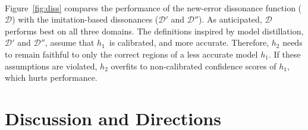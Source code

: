 \documentclass[letterpaper]{article} %
\newcommand{\bug}
    {\mbox{\rule{2mm}{2mm}}}
\newcommand{\Bug}[1]
    {\bug \footnote{BUG: {#1}}}
\newcommand{\?}{\mbox{?}}
\newcommand{\hone}{\mbox{$h_1$}}
\newcommand{\htwo}{\mbox{$h_2$}}
\newcommand{\dissonance}{\mathcal{D}}
\begin{document}
\\
 Figure~\ref{fig:diss} compares the performance of the new-error dissonance function ($\dissonance$) with the imitation-based dissonances ($\dissonance'$  and  $\dissonance''$). As anticipated, $\dissonance$ performs  best on all  three domains. The definitions inspired by model distillation, $\dissonance'$ and $\dissonance''$,  assume that \hone\ is calibrated, and more accurate. Therefore, $\htwo$ needs to remain faithful to only the correct regions of a less accurate model $\hone$. If these assumptions are violated, $\htwo$ overfits to non-calibrated confidence scores of $\hone$, which hurts performance.





\section{Discussion and Directions}
\end{document}

